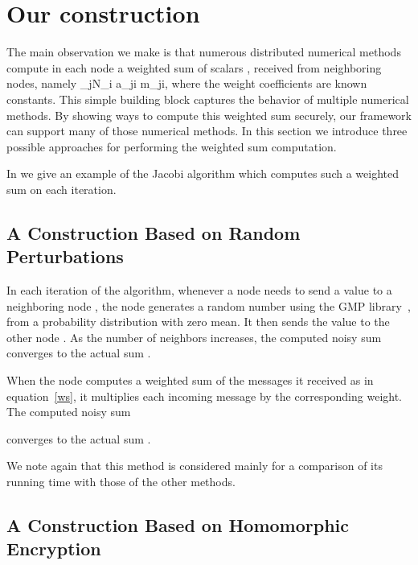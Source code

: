 \documentclass[10pt]{svjour3}
\begin{document}
\section{Our construction}
\label{sec:semi_honest} \label{const} The main observation we make
is that numerous distributed numerical methods compute in each
node a weighted sum of scalars , received from neighboring
nodes, namely \BE \label{ws} \sum_{j\in N_i} a_{ji} m_{ji}\;, \EE
where the weight coefficients   are known constants. This
simple building block captures the behavior of multiple numerical
methods. By showing ways to compute this weighted sum securely,
our framework can support many of those numerical methods. In this
section we introduce three possible approaches for performing the
weighted sum computation.

In  we give an example of the Jacobi algorithm
which computes such a weighted sum on each iteration.

\subsection{A Construction Based on Random Perturbations}
 In each iteration of the algorithm, whenever a node 
needs to send a value  to a neighboring node , the node
 generates a random number  using the GMP
library~\cite{GMP}, from a probability distribution with zero
mean. It then sends the value  to the other node
.
 As the number of neighbors increases,
the computed noisy sum  converges
to the actual sum .

When the node  computes a weighted sum of the messages it
received as in equation~\ref{ws}, it multiplies each incoming
message by the corresponding weight. The computed noisy sum

 converges to the
actual sum  .

We note again that this method is considered mainly for a comparison
of its  running
time with those of  the other methods.

\subsection{A Construction Based on Homomorphic Encryption}
\label{Homomorphic}
\end{document}
